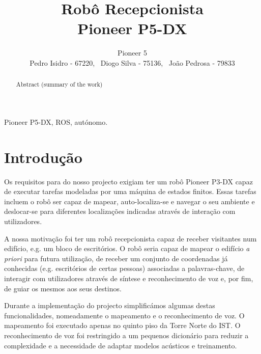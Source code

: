 \documentclass[journal]{IEEEtran}
\begin{document}
\title{Robô Recepcionista \\
	Pioneer P5-DX}

\author{\large Pioneer 5 \normalsize \\
Pedro Isidro - 67220,
~Diogo Silva - 75136,
~João Pedrosa - 79833}


\maketitle

\begin{abstract}
Abstract (summary of the work)
\end{abstract}

\begin{IEEEkeywords}
Pioneer P5-DX, ROS, autónomo.
\end{IEEEkeywords}

\section{Introdução}

Os requisitos para do nosso projecto exigiam ter um robô Pioneer P3-DX capaz de executar tarefas modeladas por uma máquina de estados finitos. Essas tarefas incluem o robô ser capaz de mapear, auto-localiza-se e navegar o seu ambiente e deslocar-se para diferentes localizações indicadas através de interação com utilizadores.

A nossa motivação foi ter um robô recepcionista capaz de receber visitantes num edifício, e.g. um bloco de escritórios. O robô seria capaz de mapear o edifício \emph{a priori} para futura utilização, de receber um conjunto de coordenadas já conhecidas (e.g. escritórios de certas pessoas) associadas a palavras-chave, de interagir com utilizadores através de síntese e reconhecimento de voz e, por fim, de guiar os mesmos aos seus destinos.

Durante a implementação do projecto simplificámos algumas destas funcionalidades, nomeadamente o mapeamento e o reconhecimento de voz. O mapeamento foi executado apenas no quinto piso da Torre Norte do IST. O reconhecimento de voz foi restringido a um pequenos dicionário para reduzir a complexidade e a necessidade de adaptar modelos acústicos e treinamento.
\end{document}
